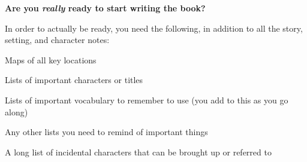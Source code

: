 \begin{compactdesc}
		\item[\tr{012}] \textbf{Are you \textit{really} ready to start writing the book?}
			\begin{compactitem}
				\item In order to actually be ready, you need the following, in addition to all the story, setting, and character notes:
					\begin{compactitem}
						\item Maps of all key locations
						\item Lists of important characters or titles
						\item Lists of important vocabulary to remember to use (you add to this as you go along)
						\item Any other lists you need to remind of important things
						\item A long list of incidental characters that can be brought up or referred to
					\end{compactitem}
			\end{compactitem}
	
	\end{compactdesc}
	
\pagebreak{}
